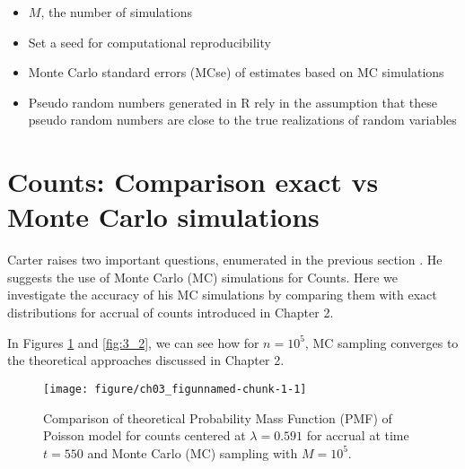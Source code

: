 \begin{itemize}
\item $M$, the number of simulations
\item Set a seed for computational reproducibility
\item Monte Carlo standard errors (MCse) of estimates based on MC simulations
\item Pseudo random numbers generated in R rely in the assumption that these pseudo random numbers are close to the true realizations of random variables \citep{held2014applied}
\end{itemize}
\section{Counts: Comparison exact vs Monte Carlo simulations}

Carter raises two important questions, enumerated in the previous section \citep{carter2004application, carter2005practical}. He suggests the use of Monte Carlo (MC) simulations for Counts. Here we investigate the accuracy of his MC simulations by comparing them with exact distributions for accrual of counts introduced in Chapter 2. 

In Figures \ref{fig:3_1} and \ref{fig:3_2}, we can see how for $n=10^5$, MC sampling converges to the theoretical approaches discussed in Chapter 2.



% 
% 
% 
% 
% 
% 

\begin{figure}
\begin{knitrout}
\color{fgcolor}
\texttt{[image: figure/ch03\_figunnamed-chunk-1-1]} 
\end{knitrout}
  \caption{Comparison of theoretical Probability Mass Function (PMF) of Poisson model for counts centered at $\lambda = 0.591$ for accrual at time $t=550$ and Monte Carlo (MC) sampling with $M=10^5$.}
  \label{fig:3_1}
\end{figure}



